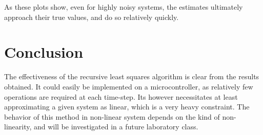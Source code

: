 As these plots show, even for highly noisy systems, the estimates ultimately approach their true values, and do so relatively quickly.
\section{Conclusion}
The effectiveness of the recursive least squares algorithm is clear from the results obtained. It could easily be implemented on a microcontroller, as relatively few operations are required at each time-step. Its however necessitates at least approximating a given system as linear, which is a very heavy constraint. The behavior of this method in non-linear system depends on the kind of non-linearity, and will be investigated in a future laboratory class.





